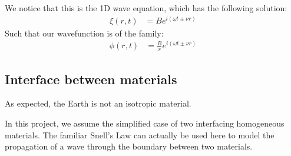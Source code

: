 We notice that this is the 1D wave equation, which has the following solution:
\begin{align*}
    \xi(r,t) &= Be^{i(\omega t \pm \nu r)}
\end{align*}
Such that our wavefunction is of the family:
\begin{align}
    \phi(r,t) &= \frac{B}{r}e^{i(\omega t \pm \nu r)}
\end{align}



\subsection{Interface between materials}
As expected, the Earth is not an isotropic material.

In this project, we assume the simplified case of two interfacing homogeneous materials. The familiar Snell's Law can actually be used here to model the propagation of a wave through the boundary between two materials.
